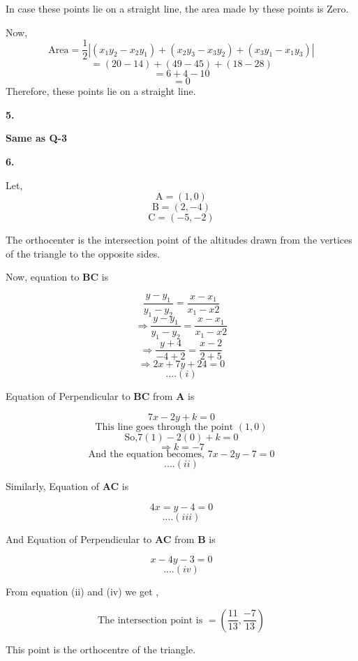 \documentclass{article}
\begin{document}
\begin{flushleft}
In case these points lie on a straight line, the area made by these points is Zero.\par
\vspace{0.5cm}
Now,
\[\text{Area} = \frac{1}{2} |(x_1y_2-x_2y_1)+(x_2y_3-x_3y_2)+(x_3y_1-x_1y_3)| \]
\[=(20-14)+(49-45)+(18-28)\]
\[=6+4-10\]
\[=0\]
\vspace{0.5cm}
Therefore, these points lie on a straight line.\par
\vspace{1cm}
\textbf{5.}\par
\vspace{0.5cm}
\textbf{Same as Q-3}\par
\newpage
\textbf{6.}\par
\vspace{0.5cm}
Let, 
\[ \text{A}=(1,0) \]
\[ \text{B}=(2,-4) \]
\[ \text{C}=(-5,-2)\]\par
The orthocenter is the intersection point of the altitudes drawn from the vertices of the triangle to the opposite sides.\par
\vspace{0.4cm}
Now, equation to \textbf{BC} is \par
\[\frac{y-y_1}{y_1-y_2}=\frac{x-x_1}{x_1-x2}\]
\[\Longrightarrow\frac{y-y_1}{y_1-y_2}=\frac{x-x_1}{x_1-x2}\]
\[\Longrightarrow\frac{y+4}{-4+2}=\frac{x-2}{2+5}\]
\[\Longrightarrow2x+7y+24=0\]
\[....(i)\]\par
Equation of Perpendicular to \textbf{BC} from \textbf{A} is\par
\[7x-2y+k=0\]
\[\text{This line goes through the point } (1,0)\]
\[\text{So,} 7(1)-2(0)+k=0\]
\[\Longrightarrow k=-7\]
\[\text{And the equation becomes, }7x-2y-7=0 \]
\[....(ii)\]\par
Similarly,
Equation of \textbf{AC} is \par
\[4x=y-4=0\]
\[....(iii)\]\par
And Equation of Perpendicular to \textbf{AC} from \textbf{B} is\par
\[x-4y-3=0\]
\[....(iv)\]\par
From equation (ii) and (iv) we get ,\par
\[\text{The intersection point is } = (\frac{11}{13} , \frac{-7}{13})\]\par
\vspace{0.5cm}
This point is the orthocentre of the triangle.\par



\end{flushleft}
\end{document}
